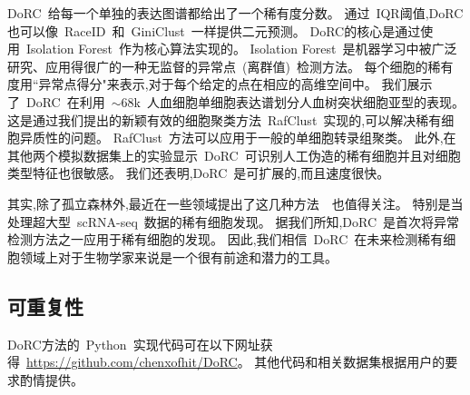 DoRC~给每一个单独的表达图谱都给出了一个稀有度分数。
通过~IQR阈值,DoRC也可以像~RaceID~和~GiniClust~一样提供二元预测。
DoRC的核心是通过使用~Isolation Forest~作为核心算法实现的。
Isolation Forest~是机器学习中被广泛研究、应用得很广的一种无监督的异常点~(离群值)~检测方法。
每个细胞的稀有度用``异常点得分"来表示,对于每个给定的点在相应的高维空间中。
我们展示了~DoRC~在利用~${\sim}68$k~人血细胞单细胞表达谱划分人血树突状细胞亚型的表现。
这是通过我们提出的新颖有效的细胞聚类方法~RafClust~实现的,可以解决稀有细胞异质性的问题。
RafClust~方法可以应用于一般的单细胞转录组聚类。
此外,在其他两个模拟数据集上的实验显示~DoRC~可识别人工伪造的稀有细胞并且对细胞类型特征也很敏感。
我们还表明,DoRC~是可扩展的,而且速度很快。

其实,除了孤立森林外,最近在一些领域提出了这几种方法~\cite{aggarwal2015theoretical,zhao2019pyod,liu2019generative,weng2019multi}~也值得关注。
特别是当处理超大型~scRNA-seq~数据的稀有细胞发现。
据我们所知,DoRC~是首次将异常检测方法之一应用于稀有细胞的发现。
因此,我们相信~DoRC~在未来检测稀有细胞领域上对于生物学家来说是一个很有前途和潜力的工具。

\subsection{可重复性}
DoRC方法的~Python~实现代码可在以下网址获得~\url{https://github.com/chenxofhit/DoRC}。
其他代码和相关数据集根据用户的要求酌情提供。

